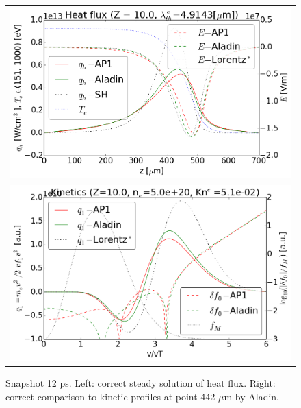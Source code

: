 \begin{figure}[tbh]
  \begin{center}
    \begin{tabular}{c}
      \includegraphics[width=\figscale\textwidth]{../VFPdata/C7_Aladin_case3_heatflux.png} \\
      \includegraphics[width=\figscale\textwidth]{../VFPdata/C7_Aladin_case3_kinetics.png}
    \end{tabular}
  \caption{  
  Snapshot 12 ps. Left: correct steady solution of heat flux. Right: correct comparison to kinetic profiles at point 442 $\mu$m by Aladin.
  }
  \end{center}
  \label{fig:C7_Aladin_case3}
\end{figure}

